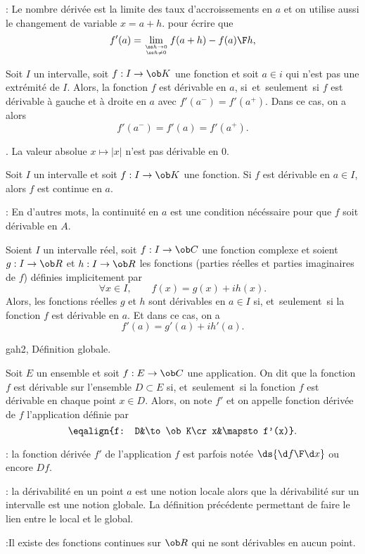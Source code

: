 \Remarque : Le nombre dérivée est la limite des taux d'accroissements en $a$ et on utilise aussi le changement de variable $x=a+h$. pour écrire que 
$$
f'(a)=\lim_{\ss h\to 0\atop\ss h\neq 0}{f(a+h)-f(a)\F h}, 
$$


\Propriete []  Soit $I$ un intervalle, soit $f:I\to\ob K$ une fonction et soit $a\in i$ qui n'est pas une extrémité de $I$. 
Alors, la fonction $f$ est dérivable en $a$, si~et~seulement~si $f$ est dérivable à gauche et à droite en $a$ avec $f'(a^-)=f'(a^+)$. Dans ce cas, on a alors
$$
f'(a^-)=f'(a)=f'(a^+).
$$
\bigskip

\Exemple. La valeur absolue $x\mapsto|x|$ n'est pas dérivable en $0$. 
\bigskip

\Propriete []  Soit $I$ un intervalle et soit $f:I\to\ob K$ une fonction. Si $f$ est dérivable en $a\in I$, alors $f$ est continue en $a$. 
\bigskip

\Remarque : En d'autres mots, la continuité en $a$ est une condition nécéssaire pour que $f$ soit dérivable en $A$. 
\bigskip

\Theoreme []  Soient $I$ un intervalle réel, soit $f:I\to\ob C$ une fonction complexe et soient $g:I\to\ob R$ et $h:I\to\ob R$ les fonctions (parties réelles et parties imaginaires de $f$) définies implicitement par  
$$
\forall x\in I,\qquad f(x)=g(x)+ih(x).
$$
Alors, les fonctions réelles $g$ et $h$ sont dérivables en $a\in I$ si, et~seulement~si la fonction $f$ 
est dérivable en $a$. Et dans ce cas, on a 
$$
f'(a)=g'(a)+ih'(a). 
$$

\Subsection gah2, Définition globale. 


\Definition []  Soit $E$ un ensemble et soit $f:E\to\ob C$ une application. On dit que la fonction $f$ est dérivable sur l'ensemble $D\subset E$ si, et~seulement~si la fonction $f$ est dérivable en chaque point $x\in D$. Alors, on note $f'$ et on appelle fonction dérivée de $f$ l'application définie par 
$$
\eqalign{f: D&\to\ob K\cr x&\mapsto f'(x)}.
$$ 

: la fonction dérivée $f'$ de l'application $f$ est parfois notée $\ds {\d f\F \d x}$ ou encore $Df$. 
\bigskip

: la dérivabilité en un point $a$ est une notion locale alors que la dérivabilité sur un intervalle est une notion globale. La définition précédente permettant de faire le lien entre le local et le global. 
\bigskip

:Il existe des fonctions continues sur $\ob R$ qui ne sont dérivables en aucun point. 

